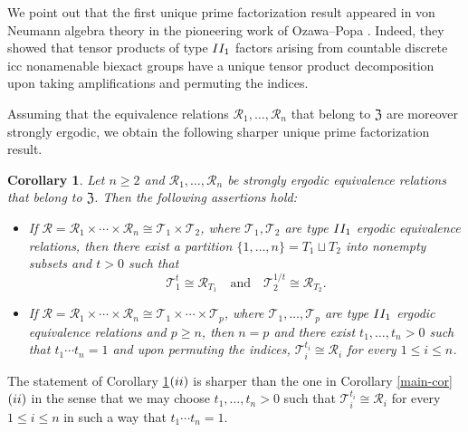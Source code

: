 \documentclass[11pt]{amsart}
\numberwithin{equation}{section}
\theoremstyle{plain}
\newtheorem{lettercor}[letterthm]{Corollary}
\theoremstyle{definition}
\begin{document}
We point out that the first unique prime factorization result appeared in von Neumann algebra theory in the pioneering work of Ozawa--Popa \cite{OP03}. Indeed, they showed that tensor products of type ${\rm II_1}$ factors arising from countable discrete icc nonamenable biexact groups have a unique tensor product decomposition upon taking amplifications and permuting the indices.


Assuming that the equivalence relations $\mathscr R_1, \dots, \mathscr R_n$ that belong to $\mathfrak Z$ are moreover strongly ergodic, we obtain the following sharper unique prime factorization result.


\begin{lettercor}\label{main-cor-sharp}
Let $n \geq 2$ and $\mathscr R_1, \dots, \mathscr R_n$ be strongly ergodic equivalence relations that belong to $\mathfrak Z$. Then the following assertions hold:

\begin{itemize}

\item [$(\rm i)$] If $\mathscr R = \mathscr R_1 \times \cdots \times \mathscr R_n \cong \mathscr T_1 \times \mathscr T_2$, where $\mathscr T_1, \mathscr T_2$ are type ${\rm II_1}$ ergodic equivalence relations, then there exist a partition $\{1, \dots, n\} = T_1 \sqcup T_2$ into nonempty subsets and $t > 0$ such that 
$$\mathscr T_1^{t} \cong \mathscr R_{T_1} \quad  \text{and} \quad  \mathscr T_2^{1/t} \cong \mathscr R_{T_2}.$$

\item [$(\rm ii)$] If $\mathscr R = \mathscr R_1 \times \cdots \times \mathscr R_n \cong \mathscr T_1 \times \cdots \times \mathscr T_p$, where $\mathscr T_1, \dots,  \mathscr T_p$ are type ${\rm II_1}$ ergodic equivalence relations and $p \geq n$, then $n = p$ and there exist $t_1, \dots, t_n > 0$ such that $t_1 \cdots t_n = 1$ and upon permuting the indices, $\mathscr T_i^{t_i} \cong \mathscr R_i$ for every $1 \leq i \leq n$. 

\end{itemize}
\end{lettercor}

The statement of Corollary \ref{main-cor-sharp}$(\rm ii)$ is sharper than the one in Corollary \ref{main-cor}$(\rm ii)$ in the sense that we may choose $t_1, \dots, t_n > 0$ such that $\mathscr T_i^{t_i} \cong \mathscr R_i$ for every $1 \leq i \leq n$ in such a way that $t_1 \cdots t_n = 1$. 
\end{document}

